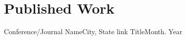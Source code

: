 \section{Published Work}
\resumeSubHeadingListStart

  \resumePublicationHeading
    {Conference/Journal Name}{City, State}
    {link}
    {Title}{Month. Year}

\resumeSubHeadingListEnd